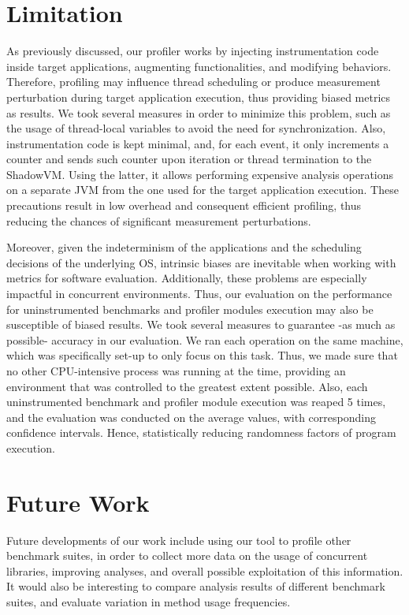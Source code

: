 \documentclass[]{usiinfthesis}
\begin{document}
\section{Limitation} \label{sec:7.1}
As previously discussed, our profiler works by injecting instrumentation code inside target applications, augmenting functionalities, and modifying behaviors. Therefore, profiling may influence thread scheduling or produce measurement perturbation during target application execution, thus providing biased metrics as results. We took several measures in order to minimize this problem, such as the usage of thread-local variables to avoid the need for synchronization. Also, instrumentation code is kept minimal, and, for each event, it only increments a counter and sends such counter upon iteration or thread termination to the ShadowVM. Using the latter, it allows performing expensive analysis operations on a separate JVM from the one used for the target application execution. These precautions result in low overhead and consequent efficient profiling, thus reducing the chances of significant measurement perturbations.

Moreover, given the indeterminism of the applications and the scheduling decisions of the underlying OS, intrinsic biases are inevitable when working with metrics for software evaluation. Additionally, these problems are especially impactful in concurrent environments. Thus, our evaluation on the performance for uninstrumented benchmarks and profiler modules execution may also be susceptible of biased results. We took several measures to guarantee -as much as possible- accuracy in our evaluation. We ran each operation on the same machine, which was specifically set-up to only focus on this task. Thus, we made sure that no other CPU-intensive process was running at the time, providing an environment that was controlled to the greatest extent possible. Also, each uninstrumented benchmark and profiler module execution was reaped 5 times, and the evaluation was conducted on the average values, with corresponding confidence intervals. Hence, statistically reducing randomness factors of program execution.



\section{Future Work} \label{sec:7.2}
Future developments of our work include using our tool to profile other benchmark suites, in order to collect more data on the usage of concurrent libraries, improving analyses, and overall possible exploitation of this information. It would also be interesting to compare analysis results of different benchmark suites, and evaluate variation in method usage frequencies.
\end{document}
